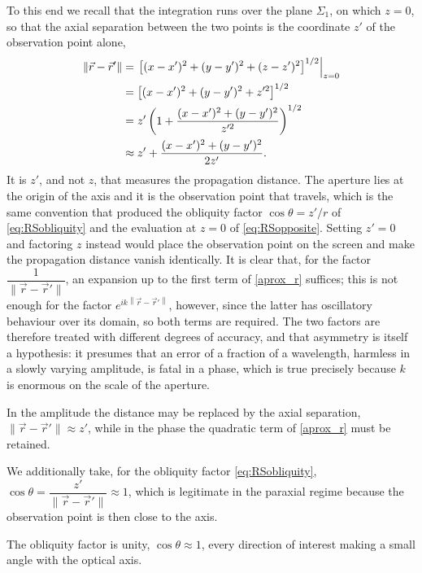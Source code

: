 To this end we recall that the integration runs over the plane $\Sigma_{1}$, on which $z=0$, so that the axial separation between the two points is the coordinate $z'$ of the observation point alone,
\begin{align}
	\label{aprox_r}
	\|\vec{r}-\vec{r}'\| &= \left.\left[(x-x')^2 + (y-y')^2 + (z-z')^2\right]^{1/2}\right|_{z=0} \notag \\
	&= \left[(x-x')^2 + (y-y')^2 + z'^2\right]^{1/2} \notag \\
	&= z'\left(1 + \dfrac{(x-x')^2 + (y-y')^2}{z'^2} \right)^{1/2} \notag \\
	&\approx z' + \dfrac{(x-x')^2+(y-y')^2}{2z'}.
\end{align}
It is $z'$, and not $z$, that measures the propagation distance. The aperture lies at the origin of the axis and it is the observation point that travels, which is the same convention that produced the obliquity factor $\cos\theta = z'/r$ of \eqref{eq:RSobliquity} and the evaluation at $z=0$ of \eqref{eq:RSopposite}. Setting $z'=0$ and factoring $z$ instead would place the observation point on the screen and make the propagation distance vanish identically.
It is clear that, for the factor $\dfrac{1}{\|\vec{r}- \vec{r}'\|}$, an expansion up to the first term of \eqref{aprox_r} suffices; this is not enough for the factor $e^{ik \left\| \vec{r} - \vec{r}' \right\|}$, however, since the latter has oscillatory behaviour over its domain, so both terms are required. The two factors are therefore treated with different degrees of accuracy, and that asymmetry is itself a hypothesis: it presumes that an error of a fraction of a wavelength, harmless in a slowly varying amplitude, is fatal in a phase, which is true precisely because $k$ is enormous on the scale of the aperture.

\begin{Assumption}
	In the amplitude the distance may be replaced by the axial separation, $\|\vec{r}-\vec{r}'\| \approx z'$, while in the phase the quadratic term of \eqref{aprox_r} must be retained.
\end{Assumption}

We additionally take, for the obliquity factor \eqref{eq:RSobliquity}, $\cos\theta = \dfrac{z'}{\|\vec{r} - \vec{r} '\|} \approx 1$, which is legitimate in the paraxial regime because the observation point is then close to the axis.

\begin{Assumption}
	The obliquity factor is unity, $\cos\theta \approx 1$, every direction of interest making a small angle with the optical axis.
\end{Assumption}


